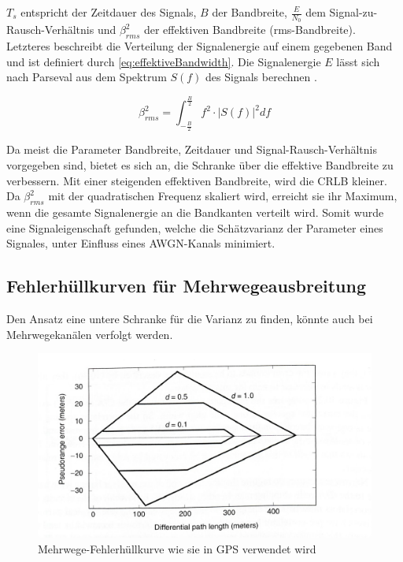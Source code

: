 $T_s$ entspricht der Zeitdauer des Signals, $B$ der Bandbreite, $\frac{E}{N_0}$ dem Signal-zu-Rausch-Verhältnis und $\beta_{rms}^2$ der effektiven Bandbreite (rms-Bandbreite). Letzteres beschreibt die Verteilung der Signalenergie auf einem gegebenen Band und ist definiert durch \eqref{eq:effektiveBandwidth}. Die Signalenergie $E$ lässt sich nach Parseval aus dem Spektrum $S(f)$ des Signals berechnen \cite[S.30]{SignaleSysteme}.

\begin{equation}
	\label{eq:effektiveBandwidth}
	\beta^2_{rms} = \int_{-\frac{B}{2}}^\frac{B}{2} f^2 \cdot |S(f)|^2 df
\end{equation}

Da meist die Parameter Bandbreite, Zeitdauer und Signal-Rausch-Verhältnis vorgegeben sind, bietet es sich an, die Schranke über die effektive Bandbreite zu verbessern. Mit einer steigenden effektiven Bandbreite, wird die \gls{CRLB} kleiner. Da $\beta^2_{rms}$ mit der quadratischen Frequenz skaliert wird, erreicht sie ihr Maximum, wenn die gesamte Signalenergie an die Bandkanten verteilt wird.
Somit wurde eine Signaleigenschaft gefunden, welche die Schätzvarianz der Parameter eines Signales, unter Einfluss eines \gls{AWGN}-Kanals minimiert. 

\subsection{Fehlerhüllkurven für Mehrwegeausbreitung}
\label{chap2.3.3:Hüllkurven}
Den Ansatz eine untere Schranke für die Varianz zu finden, könnte auch bei Mehrwegekanälen verfolgt werden.

\begin{figure}[htbp]
	\centering
	\includegraphics[scale=0.4,angle = -0.8]{images/Hullkurve}
	\caption{Mehrwege-Fehlerhüllkurve wie sie in GPS verwendet wird \cite{gps}}
	\label{fig:GPS Hüllkurve}
\end{figure}

